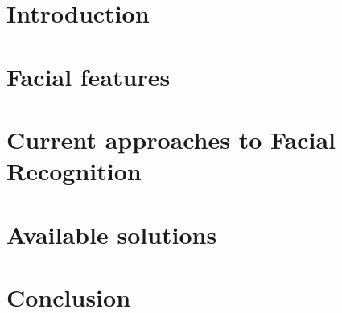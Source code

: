 
\chapter{Introduction}
\label{chapter:introduction}


\chapter{Facial features}
\label{chapter:features}


\chapter{Current approaches to Facial Recognition}
\label{chapter:research}


\chapter{Available solutions}
\label{chapter:solutions}



\chapter{Conclusion}
\label{chapter:conclusion}


